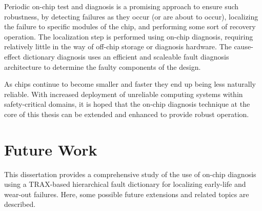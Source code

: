 Periodic on-chip test and diagnosis is a promising approach to ensure such robustness, by detecting failures as they occur (or are about to occur), localizing the failure to specific modules of the chip, and performing some sort of recovery operation.
%
The localization step is performed using on-chip diagnosis, requiring relatively little in the way of off-chip storage or diagnosis hardware.
%
The cause-effect dictionary diagnosis uses an efficient and scaleable fault diagnosis architecture to determine the faulty components of the design.

As chips continue to become smaller and faster they end up being less naturally reliable.
%
With increased deployment of unreliable computing systems within safety-critical domains, it is hoped that the on-chip diagnosis technique at the core of this thesis can be extended and enhanced to provide robust operation.


\section{Future Work}
\label{sec:conclusions_future_work}

This dissertation provides a comprehensive study of the use of on-chip diagnosis using a TRAX-based hierarchical fault dictionary for localizing early-life and wear-out failures.
%
Here, some possible future extensions and related topics are described.

